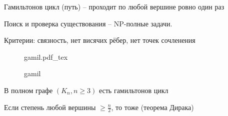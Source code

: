 \documentclass{book}
\theoremstyle{definition}
\newcommand{\incfig}[1]{%
    \def\svgwidth{\columnwidth}
    {#1.pdf_tex}
}
\begin{document}
       \begin{definition}
           Гамильтонов цикл (путь) -- проходит по любой вершине ровно один раз
       \end{definition}
       
       Поиск и проверка существования -- NP-полные задачи.

       Критерии: связность, нет висячих рёбер, нет точек сочленения

\begin{figure}[!ht]
    \centering
    \incfig{gamil}
    \caption{gamil}
    \label{fig:gamil}
\end{figure}

\begin{statement}
    В полном графе $(K_n, n\geqslant 3)$ есть гамильтонов цикл

    Если степень любой вершины $\geqslant \frac{n}{2}$, то тоже (теорема Дирака)
\end{statement}
\end{document}
